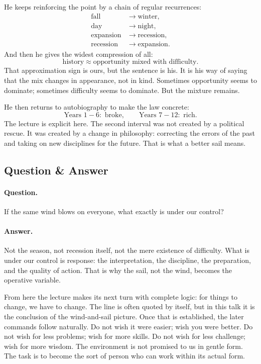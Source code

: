 He keeps reinforcing the point by a chain of regular recurrences:
\begin{align}
\text{fall} &\to \text{winter},\\
\text{day} &\to \text{night},\\
\text{expansion} &\to \text{recession},\\
\text{recession} &\to \text{expansion}.
\end{align}
And then he gives the widest compression of all:
\begin{equation}
\text{history} \approx \text{opportunity mixed with difficulty}.
\end{equation}
That approximation sign is ours, but the sentence is his. It is his way of saying that the mix changes in appearance, not in kind. Sometimes opportunity seems to dominate; sometimes difficulty seems to dominate. But the mixture remains.

He then returns to autobiography to make the law concrete:
\begin{equation}
\text{Years }1\!-\!6:\text{ broke},
\qquad
\text{Years }7\!-\!12:\text{ rich}.
\end{equation}
The lecture is explicit here. The second interval was not created by a political rescue. It was created by a change in philosophy: correcting the errors of the past and taking on new disciplines for the future. That is what a better sail means.

\subsection{Question \& Answer}

\paragraph{Question.} If the same wind blows on everyone, what exactly is under our control?

\paragraph{Answer.} Not the season, not recession itself, not the mere existence of difficulty. What is under our control is response: the interpretation, the discipline, the preparation, and the quality of action. That is why the sail, not the wind, becomes the operative variable.

From here the lecture makes its next turn with complete logic: for things to change, we have to change. The line is often quoted by itself, but in this talk it is the conclusion of the wind-and-sail picture. Once that is established, the later commands follow naturally. Do not wish it were easier; wish you were better. Do not wish for less problems; wish for more skills. Do not wish for less challenge; wish for more wisdom. The environment is not promised to us in gentle form. The task is to become the sort of person who can work within its actual form.

